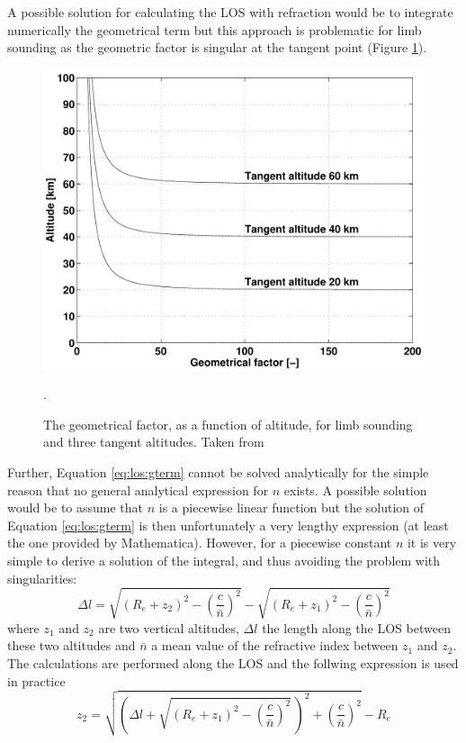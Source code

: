   A possible solution for calculating the LOS with refraction would be to 
  integrate numerically the geometrical term \citep{eriksson:00a} but 
  this approach is problematic for limb sounding as the geometric factor is
  singular at the tangent point (Figure \ref{fig:los:gfac}).
  \begin{figure}
   \begin{center}
    \includegraphics*[width=0.7\hsize]{Figs/fig_geomfac}
     \caption{The geometrical factor, as a function of altitude, for limb 
              sounding and three tangent altitudes. Taken from
              \citet{eriksson:97a}}.
    \label{fig:los:gfac}
   \end{center} 
  \end{figure}
  Further, Equation \ref{eq:los:gterm} cannot be solved analytically 
  for the simple reason that no general analytical expression for 
  $n$ exists. A possible solution would be to assume that $n$ is a
  piecewise linear function but the solution of Equation \ref{eq:los:gterm}
  is then unfortunately a very lengthy expression (at least the one provided 
  by Mathematica). However, for a piecewise constant $n$ it is very simple
  to derive a solution of the integral, and thus avoiding the problem
  with singularities:
  \begin{equation}
    \Delta l = \sqrt{(R_e+z_2)^2 - \left( \frac{c}{\bar{n}} \right)^2} -
                     \sqrt{(R_e+z_1)^2 - \left( \frac{c}{\bar{n}} \right)^2}
  \end{equation}
  where $z_1$ and $z_2$ are two vertical altitudes, $\Delta l$ the length
  along the LOS between these two altitudes and $\bar{n}$ a mean value of
  the refractive index between $z_1$ and $z_2$. The calculations are 
  performed along the LOS and the follwing expression is used in practice
  \begin{equation}
     z_2 = \sqrt{ \left( \Delta l + 
           \sqrt{(R_e+z_1)^2 - \left( \frac{c}{\bar{n}} \right)^2}\, \right)^2
                                  + \left( \frac{c}{\bar{n}} \right)^2 } - R_e 
   \label{eq:los:refr:deltal}
  \end{equation}
